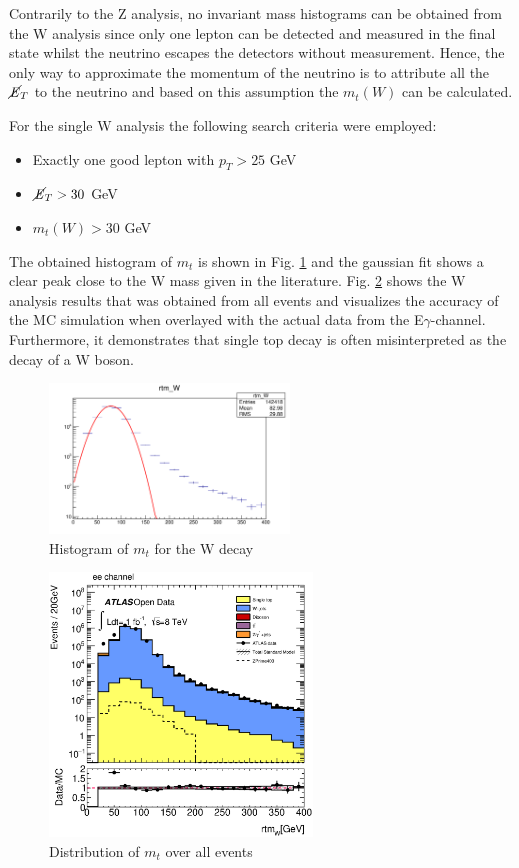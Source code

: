 \documentclass[runningheads,a4paper]{llncs}
\begin{document}
Contrarily to the Z analysis, no invariant mass histograms can be obtained from the W analysis since only one lepton can be detected and measured in the final state whilst the neutrino escapes the detectors without measurement. Hence, the only way to approximate the momentum of the neutrino is to attribute all the $\cancel{\it{E}}_{T}$ to the neutrino and based on this assumption the ${m}_{t}(W)$ can be calculated.

For the single W analysis the following search criteria were employed:
\begin{itemize}
\item Exactly one good lepton with ${p}_{T} > 25$ GeV
\item $\cancel{\it{E}}_{T} > 30$ GeV 
\item ${m}_{t}(W) > 30$ GeV
\end{itemize}

The obtained histogram of ${m}_{t}$ is shown in Fig. \ref{fig:mtw} and the gaussian fit shows a clear peak close to the W mass given in the literature. Fig. \ref{fig:mtwall} shows the W analysis results that was obtained from all events and visualizes the accuracy of the MC simulation when overlayed with the actual data from the E$\gamma$-channel. Furthermore, it demonstrates that single top decay is often misinterpreted as the decay of a W boson.

\begin{figure}
\centering
\includegraphics[height=4cm]{W_rtm_fit}
\caption{Histogram of ${m}_{t}$ for the W decay}
\label{fig:mtw}
\end{figure}

\begin{figure}
\centering
\includegraphics[height=7cm]{ee_rtmw_with_dataegamma}
\caption{Distribution of ${m}_{t}$ over all events}
\label{fig:mtwall}
\end{figure}
\end{document}
